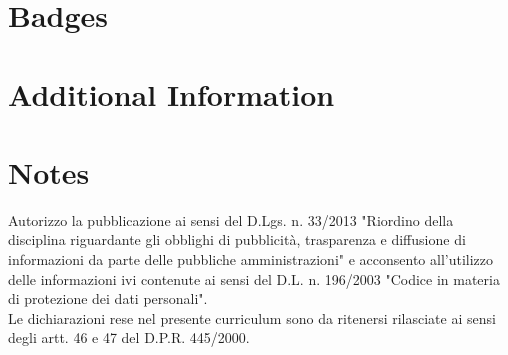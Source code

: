 \documentclass[11pt,a4paper,sans]{moderncv}
\begin{document}
  \section{Badges}
  
  
  \section{Additional Information}
  
  \section{Notes}
  Autorizzo la pubblicazione ai sensi del D.Lgs. n. 33/2013 "Riordino della disciplina riguardante gli obblighi di pubblicità, trasparenza e diffusione di informazioni da parte delle pubbliche amministrazioni" e acconsento all’utilizzo delle informazioni ivi contenute ai sensi del D.L. n. 196/2003 "Codice in materia di protezione dei dati personali". \\
  
  Le dichiarazioni rese nel presente curriculum sono da ritenersi rilasciate ai sensi degli artt. 46 e 47 del D.P.R. 445/2000.
  
\end{document}
